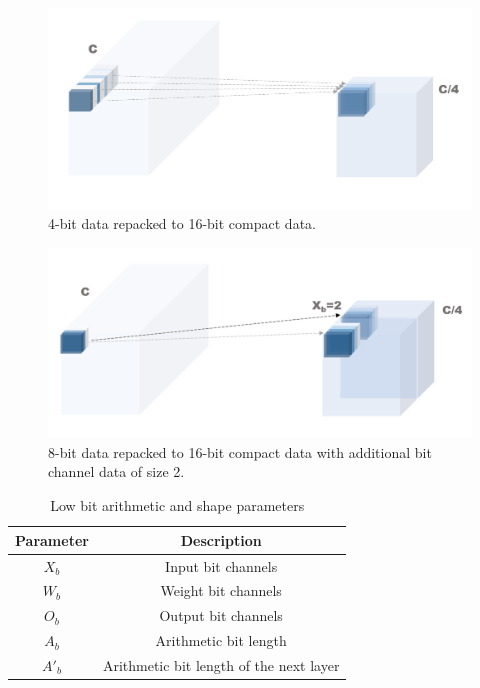 \begin{figure}
    \centering
    \includegraphics[width=1\linewidth]{inc/3_low_numeric_convolution_neural_network/figure/re_pack1.png}
    \caption{4-bit data repacked to 16-bit compact data.}
    \label{fig:re_pack1}
\end{figure}
\begin{figure}[h]
    \centering
    \includegraphics[width=1\linewidth]{inc/3_low_numeric_convolution_neural_network/figure/re_pack2.png}
    \caption{8-bit data repacked to 16-bit compact data with additional bit channel data of size 2.}
    \label{fig:re_pack2}
\end{figure}
\begin{table}[h]
    \caption{Low bit arithmetic and shape parameters}
    \label{tab:bit_shape}
    \centering
    \footnotesize 
        \begin{tabular}{cc}
        \toprule
        Parameter & Description \\
        \midrule
        $X_b$ & Input bit channels\\
        $W_b$ & Weight bit channels\\
        $O_b$ & Output bit channels\\
        $A_b$ & Arithmetic bit length\\
        $A'_b$ & Arithmetic bit length of the next layer\\
        \bottomrule
        \end{tabular}
\end{table}

